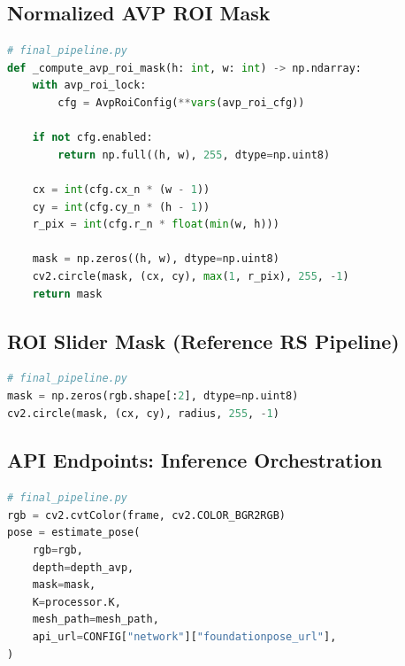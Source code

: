 \documentclass[11pt]{article}
\begin{document}
\subsection{Normalized AVP ROI Mask}

\begin{lstlisting}[style=code,language=Python,caption={Normalized circular ROI mask for the AVP view.},label={lst:avp_roi_mask}]
# final_pipeline.py
def _compute_avp_roi_mask(h: int, w: int) -> np.ndarray:
    with avp_roi_lock:
        cfg = AvpRoiConfig(**vars(avp_roi_cfg))

    if not cfg.enabled:
        return np.full((h, w), 255, dtype=np.uint8)

    cx = int(cfg.cx_n * (w - 1))
    cy = int(cfg.cy_n * (h - 1))
    r_pix = int(cfg.r_n * float(min(w, h)))

    mask = np.zeros((h, w), dtype=np.uint8)
    cv2.circle(mask, (cx, cy), max(1, r_pix), 255, -1)
    return mask
\end{lstlisting}

\subsection{ROI Slider Mask (Reference RS Pipeline)}

\begin{lstlisting}[style=code,language=Python,caption={Slider-controlled circular ROI mask (RS reference pipeline).},label={lst:roi_mask_rs}]
# final_pipeline.py
mask = np.zeros(rgb.shape[:2], dtype=np.uint8)
cv2.circle(mask, (cx, cy), radius, 255, -1)
\end{lstlisting}

\subsection{API Endpoints: Inference Orchestration}

\begin{lstlisting}[style=code,language=Python,caption={FoundationPose inference call with aligned RGB-D and mask.},label={lst:api_infer}]
# final_pipeline.py
rgb = cv2.cvtColor(frame, cv2.COLOR_BGR2RGB)
pose = estimate_pose(
    rgb=rgb,
    depth=depth_avp,
    mask=mask,
    K=processor.K,
    mesh_path=mesh_path,
    api_url=CONFIG["network"]["foundationpose_url"],
)
\end{lstlisting}

\end{document}

